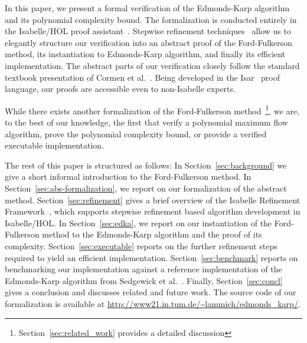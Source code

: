 \documentclass{llncs}
\begin{document}
In this paper, we present a formal verification of the Edmonds-Karp algorithm and its polynomial complexity bound.
The formalization is conducted entirely in the Isabelle/HOL proof assistant~\cite{NPW02}. 
Stepwise refinement techniques~\cite{Wirth71,Back78,BaWr98} allow us to elegantly structure our verification into an abstract proof of the Ford-Fulkerson method,
its instantiation to Edmonds-Karp algorithm, and finally its efficient implementation. The abstract parts of our verification closely follow the standard textbook presentation of Cormen et al.~\cite{CLRS09}. Being developed in the Isar~\cite{Wenzel99} proof language, our proofs are accessible even to non-Isabelle experts.

While there exists another formalization of the Ford-Fulkerson method~\cite{Lee05}\footnote{Section~\ref{sec:related_work} provides a detailed discussion}, we are, to the best of our knowledge, the first that verify a polynomial maximum flow algorithm, prove the polynomial complexity bound, or provide a verified executable implementation. 

The rest of this paper is structured as follows: In Section~\ref{sec:background} we give a short informal introduction to the Ford-Fulkerson method.
In Section~\ref{sec:abs-formalization}, we report on our formalization of the abstract method. 
Section~\ref{sec:refinement} gives a brief overview of the Isabelle Refinement Framework~\cite{LaTu12,La12}, which supports stepwise refinement based algorithm development in Isabelle/HOL. In Section~\ref{sec:edka}, we report on our instantiation of the Ford-Fulkerson method to the Edmonds-Karp algorithm and the proof of its complexity.
Section~\ref{sec:executable} reports on the further refinement steps required to yield an efficient implementation. Section~\ref{sec:benchmark} reports on 
benchmarking our implementation against a reference implementation of the Edmonds-Karp algorithm from Sedgewick et al.~\cite{SeWa11}. 
Finally, Section~\ref{sec:concl} gives a conclusion and discusses related and future work. The source code of our formalization is available at \url{http://www21.in.tum.de/~lammich/edmonds_karp/}.


\end{document}
